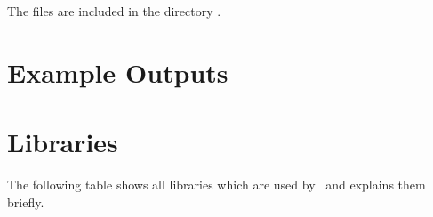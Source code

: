 The files are included in the directory \file{\aspectJBookstoreApplicationDirDistro{}/}.
      \setXMLListing
           
      

\newpage
\section{Example \KiekerTraceAnalysis{} Outputs}

  
\newpage
  \section{Libraries}
    The following table shows all libraries which are used by \Kieker\ and explains them briefly.
    

